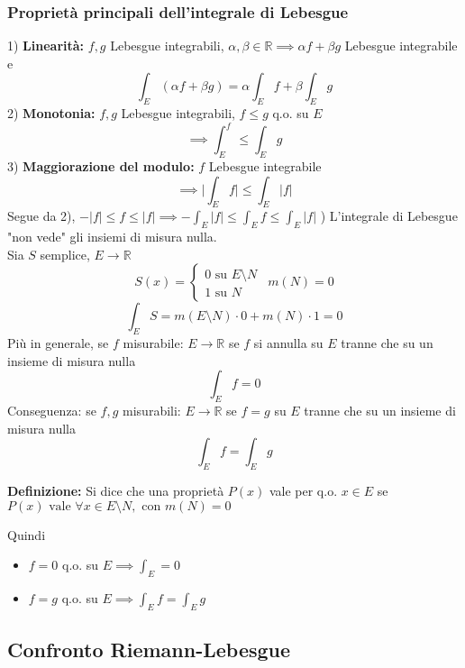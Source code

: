\documentclass[a4paper]{article}
\newcommand{\R}{\mathbb{R}}
\begin{document}
\subsubsection{Proprietà principali dell'integrale di Lebesgue}
1) \textbf{Linearità: }$f,g$ Lebesgue integrabili, $\alpha, \beta\in\R\implies \alpha f+\beta g$ Lebesgue integrabile e 
\[\int_{E}^{} (\alpha f +\beta g)=\alpha \int_{E}^{} f+\beta \int_{E}^{} g\]
2) \textbf{Monotonia: }$f,g$ Lebesgue integrabili, $f\le g$ q.o. su $E$
\[\implies \int_{E}^{f} \le \int_{E}^{} g\]
3) \textbf{Maggiorazione del modulo: }$f$ Lebesgue integrabile 
\[\implies \bigg|\int_{E}^{} f\bigg|\le \int_{E}^{} |f|\]
Segue da 2), $-|f|\le f\le |f|\implies-\int_{E}^{} |f|\le \int_{E}^{} f\le \int_{E}^{} |f|$
) L'integrale di Lebesgue "non vede" gli insiemi di misura nulla.
\\Sia $S$ semplice, $E\to \R$
\[S(x)=\begin{cases}
	0\text{ su }E\setminus N
	\\1\text{ su }N
\end{cases}\ \ m(N)=0\]
\[\int_{E}^{} S=m(E\setminus N)\cdot 0+m(N)\cdot 1=0\]
Più in generale, se $f$ misurabile: $E\to \R$ se $f$ si annulla su $E$ tranne che su un insieme di misura nulla
\[\int_{E}^{} f=0\] 
Conseguenza: se $f,g$ misurabili: $E\to \R$ se $f=g$ su $E$ tranne che su un insieme di misura nulla
\[\int_{E}^{} f=\int_{E}^{} g\]  
\begin{tcolorbox}
	\textbf{Definizione:} Si dice che una proprietà $P(x)$ vale per q.o. $x\in E$ se $P(x)\text{ vale }\forall x\in E\setminus N,\text{ con }m(N)=0$
\end{tcolorbox}
Quindi
\begin{itemize}
	\item $f=0$ q.o. su $E\implies \int_{E}^{} =0 $
	\item $f=g$ q.o. su $E\implies \int_{E}^{} f=\int_{E}^{} g $
\end{itemize}
\subsection{Confronto Riemann-Lebesgue}
\end{document}
